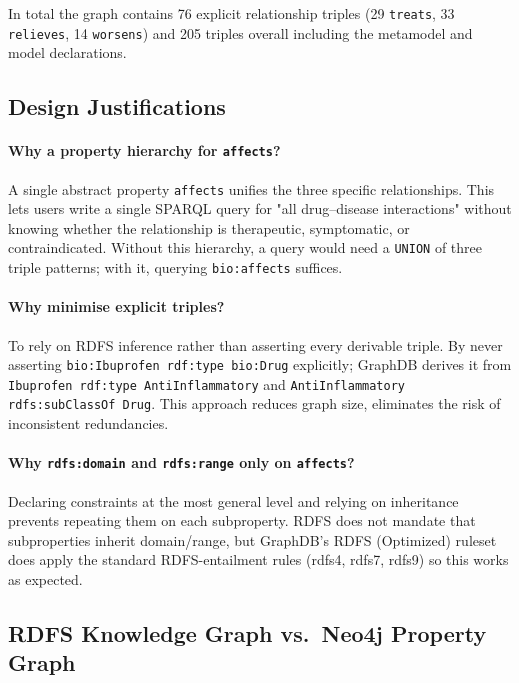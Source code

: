 \documentclass[11pt,a4paper]{article}
\begin{document}
In total the graph contains 76 explicit relationship triples (29 \texttt{treats},
33 \texttt{relieves}, 14 \texttt{worsens}) and 205 triples overall including the
metamodel and model declarations.

\subsection{Design Justifications}

\paragraph{Why a property hierarchy for \texttt{affects}?}
A single abstract property \texttt{affects} unifies the three specific
relationships.  This lets users write a single
SPARQL query for "all drug–disease interactions" without knowing 
whether the relationship is therapeutic, symptomatic, or contraindicated.
Without this hierarchy, a query would need a \texttt{UNION} of three triple
patterns; with it, querying \texttt{bio:affects} suffices.

\paragraph{Why minimise explicit triples?}
To rely on RDFS inference rather
than asserting every derivable triple. By never asserting
\texttt{bio:Ibuprofen rdf:type bio:Drug} explicitly; GraphDB derives it from
\texttt{Ibuprofen rdf:type AntiInflammatory} and
\texttt{AntiInflammatory rdfs:subClassOf Drug}.
This approach reduces graph size, eliminates the risk of inconsistent redundancies.

\paragraph{Why \texttt{rdfs:domain} and \texttt{rdfs:range} only on \texttt{affects}?}
Declaring constraints at the most general level and relying on inheritance
prevents repeating them on each subproperty.  RDFS does not mandate that
subproperties inherit domain/range, but GraphDB's RDFS (Optimized) ruleset
does apply the standard RDFS-entailment rules (rdfs4, rdfs7, rdfs9) so this
works as expected.



\subsection{RDFS Knowledge Graph vs.\ Neo4j Property Graph}
\end{document}
